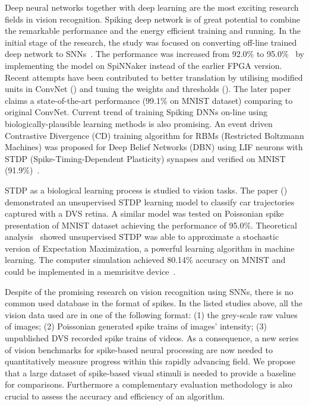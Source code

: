 Deep neural networks together with deep learning are the most exciting research fields in vision recognition.
Spiking deep network is of great potential to combine the remarkable performance and the energy efficient training and running.
In the initial stage of the research, the study was focused on converting off-line trained deep network to SNNs~\cite{o2013real}.
The performance was increased from 92.0\% to 95.0\%~\cite{unpublished_EVAN} by implementing the model on SpiNNaker instead of the earlier FPGA version.
Recent attempts have been contributed to better translation by utilising modified units in ConvNet (\cite{cao2015spiking}) and tuning the weights and thresholds (\cite{unpublished_peter}).
The later paper claims a state-of-the-art performance (99.1\% on MNIST dataset) comparing to original ConvNet.
Current trend of training Spiking DNNs on-line using biologically-plausible learning methods is also promising.
An event driven Contrastive Divergence (CD) training algorithm for RBMs (Restricted Boltzmann Machines) was proposed for Deep Belief Networks (DBN) using LIF neurons with STDP (Spike-Timing-Dependent Plasticity) synapses and verified on MNIST (91.9\%)~\cite{neftci2013event}.

STDP as a biological learning process is studied to vision tasks.
The paper (\cite{bichler2012extraction}) demonstrated an unsupervised STDP learning model to classify car trajectories captured with a DVS retina. 
A similar model was tested on Poissonian spike presentation of MNIST dataset achieving the performance of 95.0\%.
Theoretical analysis~\cite{nessler2013bayesian} showed unsupervised STDP was able to approximate a stochastic version of Expectation Maximization, a powerful learning algorithm in machine learning.
The computer simulation achieved 80.14\% accuracy on MNIST and could be implemented in a memrisitve device~\cite{bill2014compound}. 

Despite of the promising research on vision recognition using SNNs, there is no common used database in the format of spikes.
In the listed studies above, all the vision data used are in one of the following format:
(1) the grey-scale raw values of images;
(2) Poissonian generated spike trains of images' intensity;
(3) unpublished DVS recorded spike trains of videos.
As a consequence, a new series of vision benchmarks for spike-based neural processing are now needed to quantitatively measure progress within this rapidly advancing field.
We propose that a large dataset of spike-based visual stimuli is needed to provide a baseline for comparisons.
Furthermore a complementary evaluation methodology is also crucial to assess the accuracy and efficiency of an algorithm.

